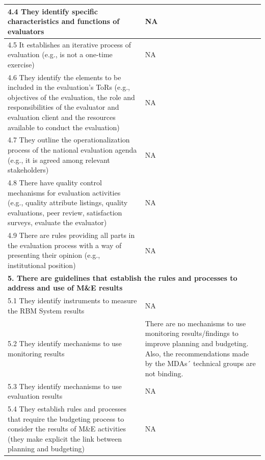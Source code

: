 \documentclass[
  10pt,
]{book}
\begin{document}
\begin{table}
\begin{tabular}[t]{l|l}
\hline
\hspace{1em}4.4 They identify specific characteristics and functions of evaluators & NA\\
\hline
\hspace{1em}4.5 It establishes an iterative process of evaluation (e.g.,  is not a one-time exercise) & NA\\
\hline
\hspace{1em}4.6 They identify the elements to be included in the evaluation's ToRs (e.g., objectives of the evaluation, the role and responsibilities of the evaluator and evaluation client and the resources available to conduct the evaluation) & NA\\
\hline
\hspace{1em}4.7 They outline the operationalization process of the national evaluation agenda (e.g., it is agreed among relevant stakeholders) & NA\\
\hline
\hspace{1em}4.8 There have quality control mechanisms for evaluation activities (e.g., quality attribute listings, quality evaluations, peer review, satisfaction surveys, evaluate the evaluator) & NA\\
\hline
\hspace{1em}4.9 There are rules providing all parts in the evaluation process with a way of presenting their opinion (e.g., institutional position) & NA\\
\hline
\multicolumn{2}{l}{\textbf{5. There are guidelines that establish the rules and processes to address and use of M\&E results}}\\
\hline
\hspace{1em}5.1 They identify instruments to measure the RBM System results & NA\\
\hline
\hspace{1em}5.2 They identify mechanisms to use monitoring results & There are no mechanisms to use monitoring results/findings to improve planning and budgeting. Also, the recommendations made by the MDAs´ technical groups are not binding.\\
\hline
\hspace{1em}5.3 They identify mechanisms to use evaluation results & NA\\
\hline
\hspace{1em}5.4 They establish rules and processes that require the budgeting process to consider the results of M\&E activities (they make explicit the link between planning and budgeting) & NA\\

\end{tabular}
\end{table}
\end{document}
